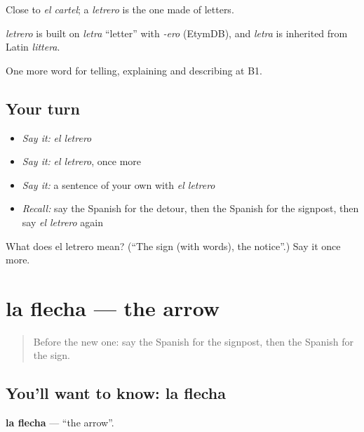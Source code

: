 Close to \emph{el cartel}; a \emph{letrero} is the one made of letters.

\begin{cousinweb}
\emph{letrero} is built on \emph{letra} \textquotedblleft{}letter\textquotedblright{} with \emph{-ero} (EtymDB), and \emph{letra} is inherited from Latin \emph{littera}.
\end{cousinweb}

\begin{grammarlens}[title={What you've built}]
One more word for telling, explaining and describing at B1.
\end{grammarlens}

\subsection*{Your turn}
\begin{itemize}
\raggedright
  \item \emph{Say it:} \emph{el letrero}
  \item \emph{Say it:} \emph{el letrero}, once more
  \item \emph{Say it:} a sentence of your own with \emph{el letrero}
  \item \emph{Recall:} say the Spanish for the detour, then the Spanish for the signpost, then say \emph{el letrero} again
\end{itemize}

\begin{tcolorbox}[breakable,colback=teal!4,colframe=teal!35!black,title={Before you move on}]
What does el letrero mean? (\textquotedblleft{}The sign (with words), the notice\textquotedblright{}.) Say it once more.
\end{tcolorbox}
\section[la flecha]{la flecha — the arrow}

\label{lesson:ES-C672-flecha}



\begin{quote}
Before the new one: say the Spanish for the signpost, then the Spanish for the sign.
\end{quote}

\subsection*{You'll want to know: la flecha}
\textbf{la flecha} — \textquotedblleft{}the arrow\textquotedblright{}.

